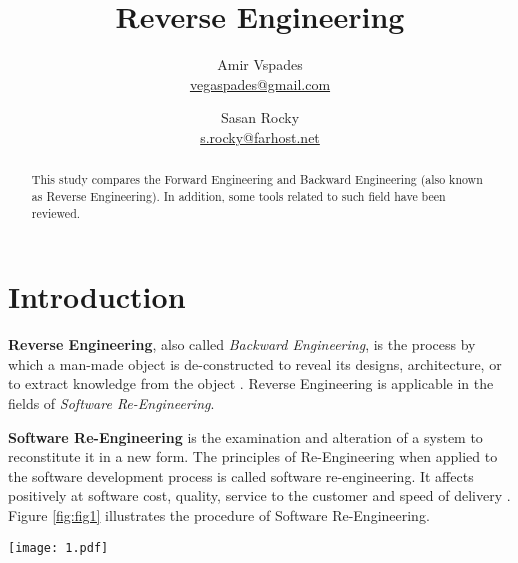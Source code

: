 \documentclass[twocolumn]{article}
\title{Reverse Engineering}
\author{Amir Vspades \\ \url{vegaspades@gmail.com}
				\and
				Sasan Rocky \\ \url{s.rocky@farhost.net}}
\date{}
\begin{document}
\maketitle

\begin{abstract}
This study compares the Forward Engineering and Backward Engineering (also
known as Reverse Engineering). In addition, some tools related to such field
have been reviewed.
\end{abstract}

\section{Introduction}\indent

\textbf{Reverse Engineering}, also called \textit{Backward Engineering}, is the
process by which a man-made object is de-constructed to reveal its designs,
architecture, or to extract knowledge from the object \cite{WEBSITE:1}. Reverse
Engineering is applicable in the fields of
\textit{Software Re-Engineering}.\newline

\textbf{Software Re-Engineering} is the examination and alteration of a system
to reconstitute it in a new form. The principles of Re-Engineering when applied
to the software development process is called software re-engineering. It
affects positively at software cost, quality, service to the customer and speed
of delivery \cite{WEBSITE:2}. Figure \ref{fig:fig1} illustrates the procedure of
Software Re-Engineering.\newline

\begin{figure*}
	\texttt{[image: 1.pdf]}
	\caption{Forward Engineering vs. Backward Engineering}
	\label{fig:fig1}
\end{figure*}
\end{document}
